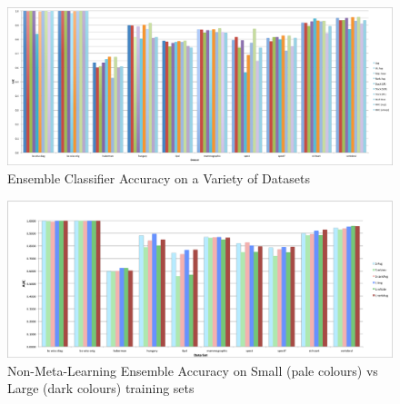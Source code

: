 \documentclass{document}
\begin{document}
\begin{figure}[p]
\centering
\includegraphics[angle=0, width=175mm]{ensemblegraph.eps}
\caption{Ensemble Classifier Accuracy on a Variety of Datasets}
\label{fig:02}
\end{figure}

\clearpage
\begin{figure}[p]
\includegraphics[angle=0, width=175mm]{smallvlargegraph.eps}
\caption{Non-Meta-Learning Ensemble Accuracy on Small (pale colours) vs Large (dark colours) training sets}
\label{fig:03}
\end{figure}
\end{document}
